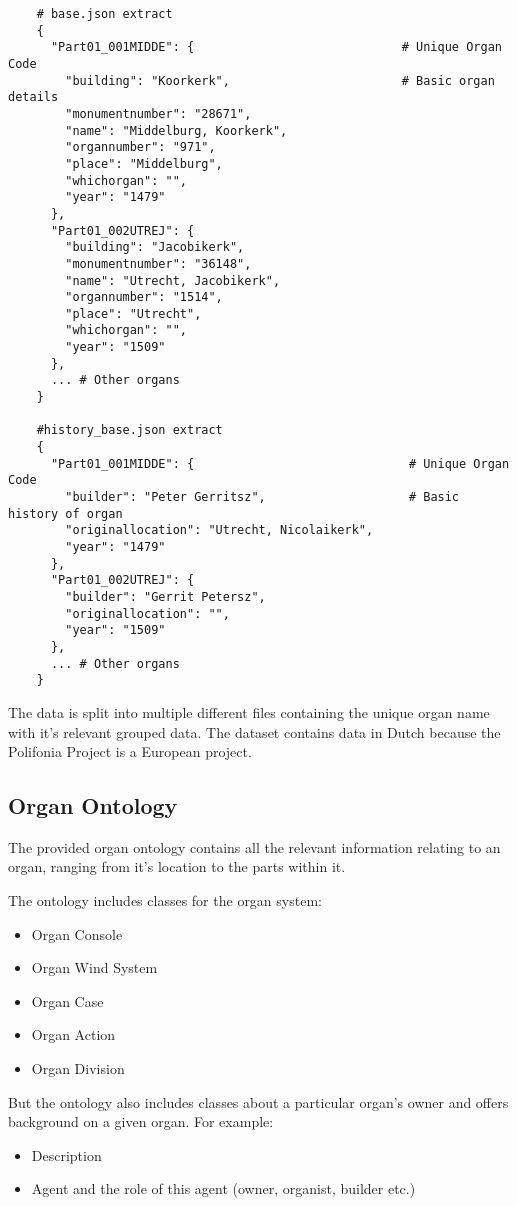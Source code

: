 \begin{lstlisting}
    # base.json extract
    {
      "Part01_001MIDDE": {                             # Unique Organ Code
        "building": "Koorkerk",                        # Basic organ details
        "monumentnumber": "28671",
        "name": "Middelburg, Koorkerk",
        "organnumber": "971",
        "place": "Middelburg",
        "whichorgan": "",
        "year": "1479"
      },
      "Part01_002UTREJ": {
        "building": "Jacobikerk",
        "monumentnumber": "36148",
        "name": "Utrecht, Jacobikerk",
        "organnumber": "1514",
        "place": "Utrecht",
        "whichorgan": "",
        "year": "1509"
      },
      ... # Other organs
    }

    #history_base.json extract
    {
      "Part01_001MIDDE": {                              # Unique Organ Code
        "builder": "Peter Gerritsz",                    # Basic history of organ
        "originallocation": "Utrecht, Nicolaikerk",
        "year": "1479"
      },
      "Part01_002UTREJ": {
        "builder": "Gerrit Petersz",
        "originallocation": "",
        "year": "1509"
      },
      ... # Other organs
    }
\end{lstlisting}

The data is split into multiple different files containing the unique organ name with it's relevant grouped data. The dataset contains data in Dutch because the Polifonia Project is a European project.

\subsection{Organ Ontology}
\hspace{0.5cm} The provided organ ontology contains all the relevant information relating to an organ, ranging from it's location to the parts within it. 

The ontology includes classes for the organ system:
\begin{itemize}
    \itemsep0em 
\item Organ Console
\item Organ Wind System
\item Organ Case
\item Organ Action
\item Organ Division
\end{itemize}

But the ontology also includes classes about a particular organ's owner and offers background on a given organ. For example:
\begin{itemize}
    \itemsep0em 
\item Description
\item Agent and the role of this agent (owner, organist, builder etc.)
\end{itemize}

